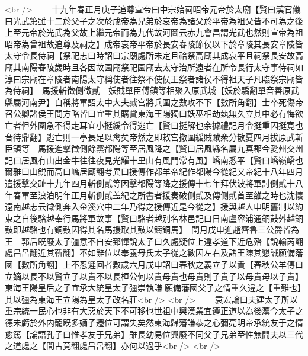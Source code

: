 <br />
　　十九年春正月庚子追尊宣帝曰中宗始祠昭帝元帝於太廟【賢曰漢官儀曰光武第雖十二於父子之次於成帝為兄弟於哀帝為諸父於平帝為祖父皆不可為之後上至元帝於光武為父故上繼元帝而為九代故河圖云赤九會昌謂光武也然則宣帝為祖昭帝為曾祖故追尊及祠之】成帝哀帝平帝於長安舂陵節侯以下於章陵其長安章陵皆太守令長侍祠【祭祀志曰時詔曰宗廟處所未定且祫祭高廟其成哀平且祠祭長安故高廟其南陽舂陵歲時且各因故園廟祭祀園廟去太守治所遠者在所令長行太守事侍祠如淳曰宗廟在章陵者南陽太守稱使者往祭不使侯王祭者諸侯不得祖天子凡臨祭宗廟皆為侍祠】　馬援斬徵側徵貳　妖賊單臣傅鎮等相聚入原武城【妖於驕翻單音善原武縣屬河南尹】自稱將軍詔太中大夫臧宫將兵圍之數攻不下【數所角翻】士卒死傷帝召公卿諸侯王問方略皆曰宜重其購賞東海王陽獨曰妖巫相劫埶無久立其中必有悔欲亡者但外圍急不得走耳宜小挺緩令得逃亡【賢曰挺解也余據禮記月令挺重囚挺寛也音待鼎翻】逃亡則一亭長足以禽矣帝然之即敕宫撤圍緩賊賊衆分散夏四月拔原武斬臣鎮等　馬援進擊徵側餘黨都陽等至居風降之【賢曰居風縣名屬九真郡今愛州交州記曰居風冇山出金牛往往夜見光耀十里山有風門常有風】嶠南悉平【賢曰嶠嶺嶠也爾雅曰山鋭而高曰嶠居廟翻考異曰援傳作都羊帝紀作都陽今從紀又帝紀十八年四月遣援擊交趾十九年四月斬側貳等因擊都陽等降之援傳十七年拜伏波將軍討側貳十八年春軍至浪泊明年正月斬側貳盖紀之所書者援奏破側貳及傳側貳首至雒之時也沈懷遠南越志云徵側奔入金溪穴中二年乃得之援傳近是今從之】援與越人申明舊制以約束之自後駱越奉行馬將軍故事【賢曰駱者越别名林邑記曰日南盧容浦通銅鼓外越銅鼓即越駱也有銅鼔因得其名馬援取其鼓以鑄銅馬】　閏月戊申進趙齊魯三公爵皆為王　郭后旣廢太子彊意不自安郅惲說太子曰久處疑位上違孝道下近危殆【說輸芮翻處昌呂翻近其靳翻】不如辭位以奉養母氏太子從之數因左右及諸王陳其懇誠願備藩國【數所角翻】上不忍遲回者數歲六月戊申詔曰春秋之義立子以貴【春秋公羊傳曰立嫡以長不以賢立子以貴不以長桓公何以貴母貴也母貴則子貴子以母貴母以子貴】東海王陽皇后之子宜承大統皇太子彊崇執謙願備藩國父子之情重久違之【重難也】其以彊為東海王立陽為皇太子改名莊<br />
<br />
　　袁宏論曰夫建太子所以重宗統一民心也非有大惡於天下不可移也世祖中興漢業宜遵正道以為後灋今太子之德未虧於外内寵旣多嫡子遷位可謂失矣然東海歸藩謙恭之心彌亮明帝承統友于之情愈篤【論語孔子曰惟孝友于兄弟】雖長幼易位興廢不同父子兄弟至性無間夫以三代之道處之【間古莧翻處昌呂翻】亦何以過乎<br />
<br />
